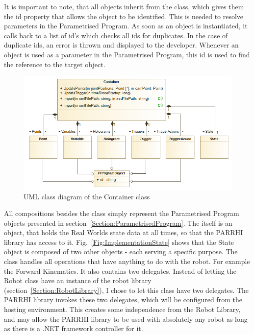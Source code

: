 It is important to note, that all objects inherit from the  class, which gives them the id property that allows the object to be identified. This is needed to resolve parameters in the Parametrised Program. As soon as an object is instantiated, it calls back to a list of id's which checks all ids for duplicates. In the case of duplicate ids, an error is thrown and displayed to the developer. Whenever an object is used as a parameter in the Parametrised Program, this id is used to find the reference to the target object.

\begin{figure}[!h]
	\centering
	\includegraphics[width=1\linewidth]{Figures/Implementation_Container}
	\caption[UML class diagram of the Container class]{UML class diagram of the Container class}
	\label{Fig:ImplementationContainer}
\end{figure}

All compositions besides the  class simply represent the Parametrised Program objects presented in section~\ref{Section:ParametrisedProgram}. The  itself is an object, that holds the Real Worlds state data at all times, so that the PARRHI library has access to it. Fig.~\ref{Fig:ImplementationState} shows that the State object is composed of two other objects - each serving a specific purpose. The  class handles all operations that have anything to do with the robot. For example the Forward Kinematics. It also contains two delegates. Instead of letting the Robot class have an instance of the robot library (section~\ref{Section:RobotLibrary}), I chose to let this class have two delegates. The PARRHI library invokes these two delegates, which will be configured from the hosting environment. This creates some independence from the Robot Library, and may allow the PARRHI library to be used with absolutely any robot as long as there is a .NET framework controller for it.

